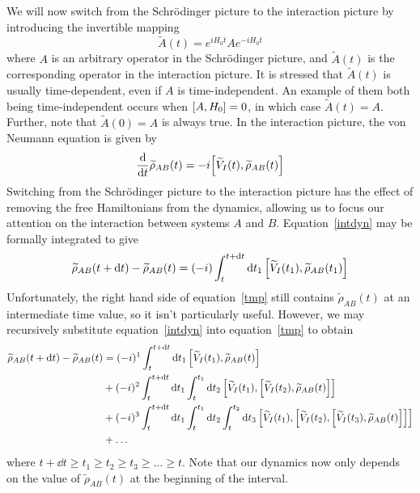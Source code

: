 \documentclass[aps, prl, preprint]{revtex4-1}
\newcommand{\til}[1]{\widetilde{#1}}
\begin{document}
We will now switch from the Schr{\"o}dinger picture to the interaction picture by introducing the invertible mapping
\begin{equation}\label{intpic}
\til{A}(t) = e^{iH_0t}Ae^{-iH_0t}
\end{equation}
where $A$ is an arbitrary operator in the Schr{\"o}dinger picture, and $\til{A}(t)$ is the corresponding operator in the interaction picture. It is stressed that $\til{A}(t)$ is usually time-dependent, even if $A$ is time-independent. An example of them both being time-independent occurs when $\comm{A}{H_0} = 0$, in which case $\til{A}(t) = A$. Further, note that $\til{A}(0) = A$ is always true. In the interaction picture, the von Neumann equation is given by
\begin{equation}\label{intdyn}
\dv{t}\til{\rho}_{AB}(t) = -i\comm{\til{V}_I(t)}{\til{\rho}_{AB}(t)}
\end{equation}
Switching from the Schr{\"o}dinger picture to the interaction picture has the effect of removing the free Hamiltonians from the dynamics, allowing us to focus our attention on the interaction between systems $A$ and $B$. Equation~\ref{intdyn} may be formally integrated to give
\begin{equation}\label{tmp}
\til{\rho}_{AB}(t+\dd{t}) - \til{\rho}_{AB}(t) = (-i)\int_t^{t+\dd{t}}\dd{t_1}\comm{\til{V}_I(t_1)}{\til{\rho}_{AB}(t_1)}
\end{equation}
Unfortunately, the right hand side of equation~\ref{tmp} still contains $\til{\rho}_{AB}(t)$ at an intermediate time value, so it isn't particularly useful. However, we may recursively substitute equation~\ref{intdyn} into equation~\ref{tmp} to obtain
\begin{align}\label{totintpert}
\begin{split}
\til{\rho}_{AB}(t+\dd{t}) - \til{\rho}_{AB}(t) &= (-i)^1\int_t^{t+\dd{t}}\dd{t_1}\comm{\til{V}_I(t_1)}{\til{\rho}_{AB}(t)}\\
&+(-i)^2\int_t^{t+\dd{t}}\dd{t_1}\int_t^{t_1}\dd{t_2}\comm{\til{V}_I(t_1)}{\comm{\til{V}_I(t_2)}{\til{\rho}_{AB}(t)}}\\
&+(-i)^3\int_t^{t+\dd{t}}\dd{t_1}\int_t^{t_1}\dd{t_2}\int_t^{t_2}\dd{t_3}\comm{\til{V}_I(t_1)}{\comm{\til{V}_I(t_2)}{\comm{\til{V}_I(t_3)}{\til{\rho}_{AB}(t)}}}\\
&+\ldots
\end{split}
\end{align}
where $t+\dd{t}\geq t_1\geq t_2\geq t_3\geq \ldots\geq t$. Note that our dynamics now only depends on the value of $\til{\rho}_{AB}(t)$ at the beginning of the interval.
\end{document}
